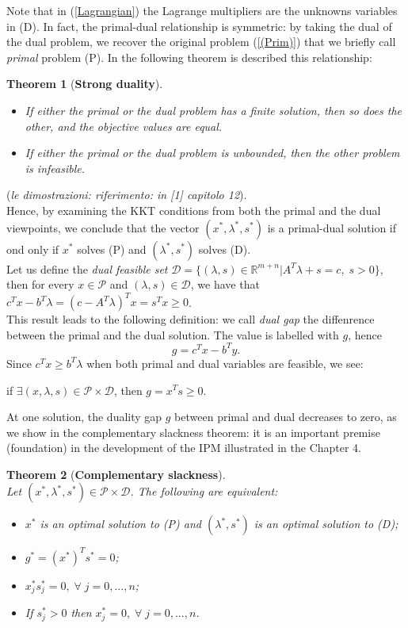 \documentclass[a4paper,10 pt,titlepage,twoside]{book}
\theoremstyle{plain}
\newtheorem{thm}{Theorem}[chapter]
\theoremstyle{definition}
\theoremstyle{remark}
\begin{document}
Note that in (\ref{Lagrangian}) the Lagrange multipliers are the unknowns variables in (D). In fact, the primal-dual relationship is symmetric: by taking the dual of the dual problem, we recover the original problem (\ref{(Prim)}) that we briefly call \textit{primal} problem (P). In the following theorem is described this relationship:
\begin{thm}[\textbf{Strong duality}] 
	\begin{itemize}
		\
		\item If either the primal or the dual problem has a finite solution, then so does the other, and the objective values are equal.
		\item If either the primal or the dual problem is unbounded, then the other problem is infeasible.
	\end{itemize}
\end{thm}
(\textit{le dimostrazioni: riferimento: in [1] capitolo 12}).\\[0.5 cm] Hence, by examining the KKT conditions from both the primal and the dual viewpoints, we conclude that the vector $(x^{*},\lambda^{*},s^{*})$ is a primal-dual solution if ond only if $x^{*}$ solves (P) and $(\lambda^{*},s^{*})$ solves (D).\\[1cm]
Let us define the \textit{dual feasible set} $\mathcal{D}=\{(\lambda,s)\in\mathbb{R}^{m+n}| A^{T}\lambda+s= c,\;s>0\}$, then for every $x\in\mathcal{P}$ and $\left(\lambda,s\right)\in\mathcal{D}$, we have that $c^{T}x-b^{T}\lambda=\left(c-A^{T}\lambda\right)^{T}x=s^{T}x \geq0$.\\
This result leads to the following definition: we call \textit{dual gap} the diffenrence between the primal and the dual solution. The value is labelled with $g$, hence
\begin{equation}\label{dualgap}
g = c^{T}x - b^{T}y.
\end{equation}
Since $c^{T}x\geq b^{T}\lambda$ when both primal and dual variables are feasible, we see:\begin{center}
	if $\exists(x,\lambda,s)\in\mathcal{P}\times\mathcal{D}$, then $g= x^{T}s \geq0$.
\end{center}
At one solution, the duality gap $g$ between primal and dual decreases to zero, as we show in the complementary slackness theorem: it is an important premise (foundation) in the development of the IPM illustrated in the Chapter 4.
\begin{thm}[\textbf{Complementary slackness}] \ \\
	Let $(x^{*},\lambda^{*},s^{*})\in\mathcal{P}\times\mathcal{D}$. The following are equivalent:
	\begin{itemize}
		\item $x^{*}$ is an optimal solution to (P) and $(\lambda^{*},s^{*})$ is an optimal solution to (D);
		\item $g^{*} = (x^{*})^{T}s^{*}=0$;
		\item $x^{*}_{j}s^{*}_{j}=0,\;\forall\; j=0,...,n$;
		\item If $s^{*}_{j} > 0$ then $x^{*}_{j}= 0,\;\forall\; j=0,...,n$.
	\end{itemize}
\end{thm}
\end{document}
